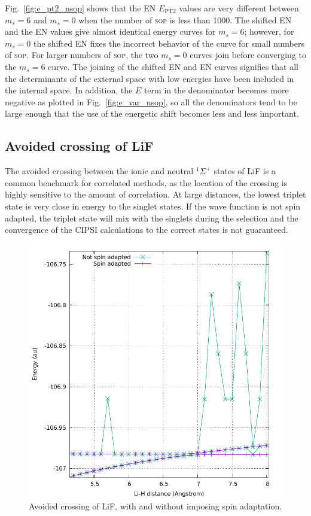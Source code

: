 \documentclass[aip,jcp,reprint,showkeys]{revtex4-1}
\newcommand{\sop}{\textsc{sop}}
\newcommand{\ept}{E_\text{PT2}}
\begin{document}
Fig.~\ref{fig:e_pt2_nsop} shows that the EN $\ept$ values are very different
between $m_s=6$ and $m_s=0$ when the number of \sop{} is less than 1000. The
shifted EN and the EN values give almost identical energy curves for $m_s=6$;
however, for $m_s=0$ the shifted EN fixes the incorrect behavior of the curve
for small numbers of \sop{}. For larger numbers of \sop{}, the two $m_s=0$
curves join before converging to
the $m_s=6$ curve. The joining of the shifted EN and EN curves signifies
that all the determinants of the external space with low energies have been included
in the internal space. In addition, the $E$ term in the denominator becomes more
negative as plotted in Fig.~\ref{fig:e_var_nsop}, so all the denominators tend to be large enough that the use of the energetic shift becomes less and
less important.


\subsection{Avoided crossing of LiF}

The avoided crossing between the ionic and neutral $^1\Sigma^+$ states of LiF is a 
common benchmark for correlated methods, as the location of the crossing is highly
sensitive to the amount of correlation. At large distances, the lowest triplet state
is very close in energy to the singlet states. If the wave function is not
spin adapted, the triplet state will mix with the singlets during the selection
and the convergence of the CIPSI calculations to the correct states is not guaranteed.

\begin{figure}
\includegraphics[width=0.9\columnwidth]{lif}
\caption{Avoided crossing of LiF, with and without imposing spin adaptation.}
\label{fig:lif}
\end{figure}
\end{document}

